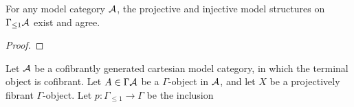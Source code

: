 \documentclass[a4paper]{amsart}
\begin{document}
\begin{lemma}
	For any model category $\mathcal A$, the projective and injective model structures on $\Gamma_{\leq 1} \mathcal A$ exist and agree. 
\end{lemma}

\begin{proof}
\end{proof}





\begin{proposition}
	Let $\mathcal A$ be a cofibrantly generated cartesian model category, in which the terminal object is cofibrant. Let $A \in \Gamma\mathcal A$ be a $\Gamma$-object in $\mathcal A$, and let $X$ be a projectively fibrant $\Gamma$-object. Let $p:\Gamma_{\leq 1} \to \Gamma$ be the inclusion 
\end{proposition}


\end{document}
